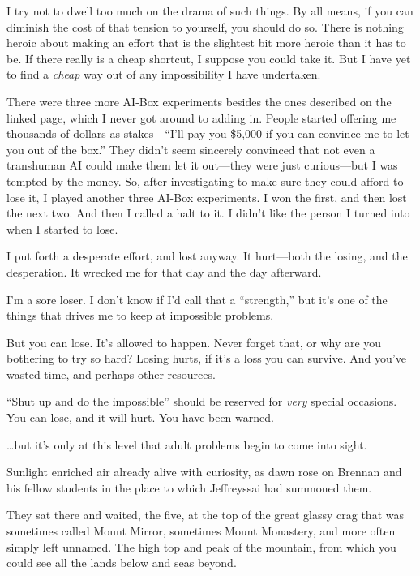 {
 I try not to dwell too much on the drama of such things. By all
means, if you can diminish the cost of that tension to yourself, you
should do so. There is nothing heroic about making an effort that is
the slightest bit more heroic than it has to be. If there really is a
cheap shortcut, I suppose you could take it. But I have yet to find a
\textit{cheap} way out of any impossibility I have undertaken.}

{
 There were three more AI-Box experiments besides the ones
described on the linked page, which I never got around to adding in.
People started offering me thousands of dollars as
stakes---``I'll pay you \$5,000 if you
can convince me to let you out of the box.'' They
didn't seem sincerely convinced that not even a
transhuman AI could make them let it out---they were just curious---but
I was tempted by the money. So, after investigating to make sure they
could afford to lose it, I played another three AI-Box experiments. I
won the first, and then lost the next two. And then I called a halt to
it. I didn't like the person I turned into when I
started to lose.}

{
 I put forth a desperate effort, and lost anyway. It hurt---both
the losing, and the desperation. It wrecked me for that day and the day
afterward.}

{
 I'm a sore loser. I don't know if
I'd call that a
``strength,'' but
it's one of the things that drives me to keep at
impossible problems.}

{
 But you can lose. It's allowed to happen. Never
forget that, or why are you bothering to try so hard? Losing hurts, if
it's a loss you can survive. And you've
wasted time, and perhaps other resources.}

{
 ``Shut up and do the
impossible'' should be reserved for \textit{very}
special occasions. You can lose, and it will hurt. You have been
warned.}

{
 \ldots but it's only at this level that adult
problems begin to come into sight.}

\myendsectiontext


{
 Sunlight enriched air already alive with curiosity, as dawn rose
on Brennan and his fellow students in the place to which Jeffreyssai
had summoned them. }

{
 They sat there and waited, the five, at the top of the great
glassy crag that was sometimes called Mount Mirror, sometimes Mount
Monastery, and more often simply left unnamed. The high top and peak of
the mountain, from which you could see all the lands below and seas
beyond.}

